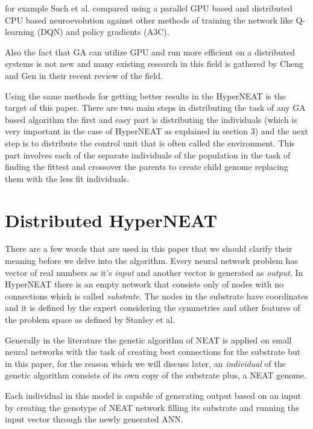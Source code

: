 \documentclass[twocolumn]{article}
\begin{document}
for example Such et al. compared using a parallel GPU based and distributed CPU based neuroevolution against other methods of training the network like Q-learning (DQN) and policy gradients (A3C). \cite{GA-GPU-Comparison}

Also the fact that GA can utilize GPU and run more efficient on a distributed systems is not new and many existing research in this field is gathered by Cheng and Gen in their recent review of the field. \cite{GA-GPU-Review}

Using the same methods for getting better results in the HyperNEAT is the target of this paper. There are two main steps in distributing the task of any GA based algorithm the first and easy part is distributing the individuals (which is very important in the case of HyperNEAT as explained in section 3) and the next step is to distribute the control unit that is often called the environment. This part involves each of the separate individuals of the population in the task of finding the fittest and crossover the parents to create child genome replacing them with the less fit individuals.


\section{Distributed HyperNEAT}
There are a few words that are used in this paper that we should clarify their meaning before we delve into the algorithm. Every neural network problem has vector of real numbers as it's \textit{input} and another vector is generated as \textit{output}. In HyperNEAT there is an empty network that consists only of nodes with no connections which is called \textit{substrate}. The nodes in the substrate have coordinates and it is defined by the expert considering the symmetries and other features of the problem space as defined by Stanley et al. \cite{originalHyperNEAT}

Generally in the literature the genetic algorithm of NEAT is applied on small neural networks with the task of creating best connections for the substrate but in this paper, for the reason which we will discuss later, an \textit{individual} of the genetic algorithm consists of its own copy of the substrate plus, a NEAT genome.

Each individual in this model is capable of generating output based on an input by creating the genotype of NEAT network filling its substrate and running the input vector through the newly generated ANN.
\end{document}
